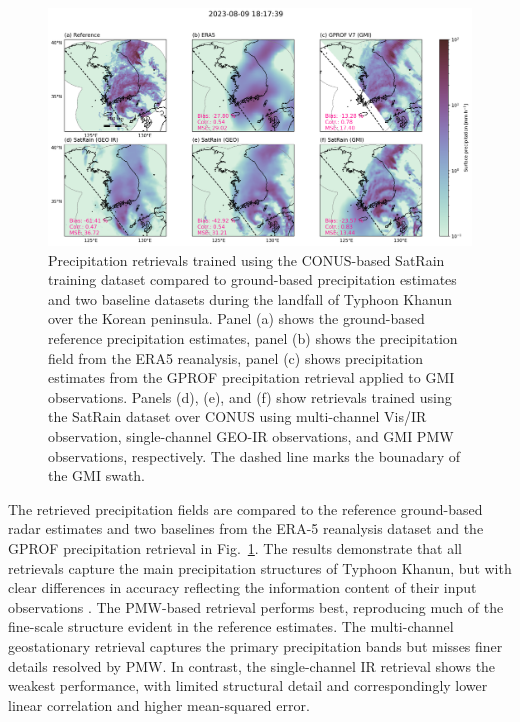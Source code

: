 \documentclass[11pt]{article}
\begin{document}
\begin{figure}[htbp] %
	\centering
	\includegraphics[width=1.0\textwidth]{figures/fig09}
	\caption{
		Precipitation retrievals trained using the CONUS-based SatRain
		training dataset compared to ground-based precipitation estimates and two
		baseline datasets during the landfall of Typhoon Khanun over the Korean
		peninsula. Panel (a) shows the ground-based reference precipitation
		estimates, panel (b) shows the precipitation field from the ERA5 reanalysis,
		panel (c) shows precipitation estimates from the GPROF precipitation
		retrieval applied to GMI observations. Panels (d), (e), and (f) show
		retrievals trained using the SatRain dataset over CONUS using multi-channel
		Vis/IR observation, single-channel GEO-IR observations, and GMI PMW
		observations, respectively. The dashed line marks the bounadary of the GMI
		swath.
	}
	\label{fig:case_study}
\end{figure}

The retrieved precipitation fields are compared to the reference ground-based
radar estimates and two baselines from the ERA-5 reanalysis dataset and the
GPROF precipitation retrieval in Fig.~\ref{fig:case_study}. The results
demonstrate that all retrievals capture the main precipitation structures of
Typhoon Khanun, but with clear differences in accuracy reflecting the
information content of their input observations \citep{Kidd2011GPM}. The
PMW-based retrieval performs best, reproducing much of the fine-scale structure
evident in the reference estimates. The multi-channel geostationary retrieval
captures the primary precipitation bands but misses finer details resolved by
PMW. In contrast, the single-channel IR retrieval shows the weakest performance,
with limited structural detail and correspondingly lower linear correlation and
higher mean-squared error.
\end{document}
